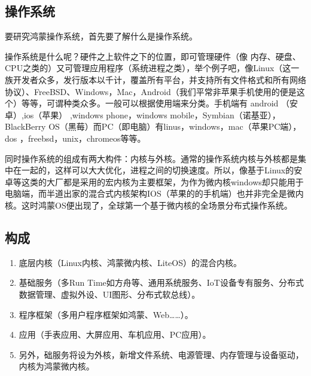 \documentclass{article}
\begin{document}
\subsection{操作系统}
要研究鸿蒙操作系统，首先要了解什么是操作系统。\par
操作系统是什么呢？硬件之上软件之下的位置，即可管理硬件（像 内存、硬盘、CPU之类的）又可管理应用程序（系统进程之类），举个例子吧，像Linux（这一族开发者众多，发行版本以千计，覆盖所有平台，并支持所有文件格式和所有网络协议）、FreeBSD、Windows，Mac，Android（我们平常非苹果手机使用的便是这个）等等，可谓种类众多。一般可以根据使用端来分类。手机端有 android （安卓）,ios（苹果） ,windows phone，windows mobile，Symbian（诺基亚），BlackBerry OS（黑莓）而PC（即电脑）有linus，windows，mac（苹果PC端），dos ，freebsd，unix，chromeos等等。\par
同时操作系统的组成有两大构件：内核与外核。通常的操作系统内核与外核都是集中在一起的，这样可以大大优化，进程之间的切换速度。所以，像基于Linux的安卓等这类的大厂都是采用的宏内核为主要框架，为作为微内核windows却只能用于电脑端，而半道出家的混合式内核架构IOS（苹果的的手机端）也并非完全是微内核。这时鸿蒙OS便出现了，全球第一个基于微内核的全场景分布式操作系统。\par 
\subsection{构成}
\begin{enumerate}
    \item []底层内核（Linux内核、鸿蒙微内核、LiteOS）的混合内核。
    \item []基础服务（多Run Time如方舟等、通用系统服务、IoT设备专有服务、分布式数据管理、虚拟外设、UI图形、分布式软总线）。
    \item []程序框架（多用户程序框架如鸿蒙、Web……）。
    \item []应用（手表应用、大屏应用、车机应用、PC应用）。
    \item []另外，础服务将设为外核，新增文件系统、电源管理、内存管理与设备驱动，内核为鸿蒙微内核。
\end{enumerate}
\end{document}
